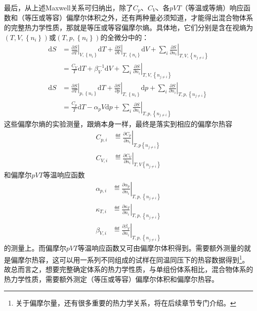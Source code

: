 \documentclass[main.tex]{subfiles}
\begin{document}
最后，从上述Maxwell关系可归纳出，除了$C_p$、$C_V$、各$pVT$（等温或等熵）响应函数和（等压或等容）偏摩尔体积之外，还有两种量必须知道，才能得出混合物体系的完整热力学性质，那就是等压或等容偏摩尔熵。具体地，它们分别是含在视熵为$\left(T,V,\left\{n_i\right\}\right)$或$\left(T,p,\left\{n_i\right\}\right)$的全微分中的：
\begin{align}
    \mathrm{d}S & =\left.\frac{\partial S}{\partial T}\right|_{V,\left\{n_i\right\}}\mathrm{d}T+\left.\frac{\partial S}{\partial V}\right|_{T,\left\{n_i\right\}}\mathrm{d}V+\sum_i\left.\frac{\partial S}{\partial n_i}\right|_{T,V,\left\{n_{j\neq i}\right\}} \\
                & =\frac{C_V}{T}\mathrm{d}T+\beta_V^{-1}\mathrm{d}V+\sum_i\left.\frac{\partial S}{\partial n_i}\right|_{T,V,\left\{n_{j\neq i}\right\}} \label{eq:I.1_dS_T_V}                                                                                    \\
    \mathrm{d}S & =\left.\frac{\partial S}{\partial T}\right|_{p,\left\{n_i\right\}}\mathrm{d}T+\left.\frac{\partial S}{\partial p}\right|_{T,\left\{n_i\right\}}\mathrm{d}p+\sum_i\left.\frac{\partial S}{\partial n_i}\right|_{T,p,\left\{n_{j\neq i}\right\}} \\
                & =\frac{C_p}{T}\mathrm{d}T-\alpha_pV\mathrm{d}p+\sum_i\left.\frac{\partial S}{\partial n_i}\right|_{T,p,\left\{n_{j\neq i}\right\}}\label{eq:I.1_dS_T_p}
\end{align}
这些偏摩尔熵的实验测量，跟熵本身一样，最终是落实到相应的偏摩尔热容
\begin{align}
    C_{p,i} & \eqdef\left.\frac{\partial C_p}{\partial n_i}\right|_{T,p\left\{n_{j\neq i}\right\}} \\
    C_{V,i} & \eqdef\left.\frac{\partial C_V}{\partial n_i}\right|_{T,V\left\{n_{j\neq i}\right\}}
\end{align}
和偏摩尔$pVT$等温响应函数
\begin{align}
    \alpha_{p,i} & \eqdef\left.\frac{\partial \alpha_p}{\partial n_i}\right|_{T,p,\left\{n_{j\neq i}\right\}} \\
    \kappa_{T,i} & \eqdef\left.\frac{\partial \kappa_T}{\partial n_i}\right|_{T,p,\left\{n_{j\neq i}\right\}} \\
    \beta_{V,i}  & \eqdef\left.\frac{\partial \beta_V}{\partial n_i}\right|_{T,p,\left\{n_{j\neq i}\right\}}
\end{align}
的测量上。而偏摩尔$pVT$等温响应函数又可由偏摩尔体积得到。需要额外测量的就是偏摩尔热容，这可以用一系列不同组成的试样在同温同压下的热容数据得到\footnote{关于偏摩尔量，还有很多重要的热力学关系，将在后续章节专门介绍。}。故总而言之，想要完整确定体系的热力学性质，与单组份体系相比，混合物体系的热力学性质，需要额外测定（等压或等容）偏摩尔体积和偏摩尔热容。
\end{document}
